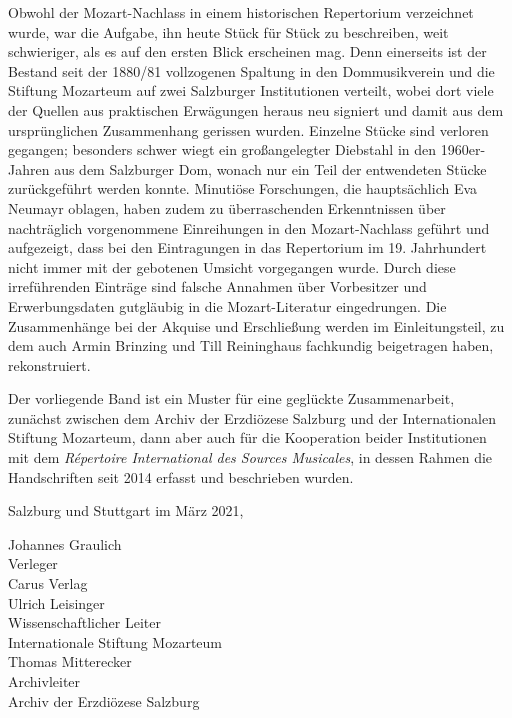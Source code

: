 Obwohl der \glqq Mozart-Nachlass\grqq{} in einem historischen Repertorium verzeichnet wurde, war die Aufgabe, ihn heute Stück für Stück zu beschreiben, weit schwieriger, als es auf den ersten Blick erscheinen mag. Denn einerseits ist der Bestand seit der 1880/81 vollzogenen Spaltung in den Dommusikverein und die \glqq Stiftung\grqq{} Mozarteum auf zwei Salzburger Institutionen verteilt, wobei dort viele der Quellen aus praktischen Erwägungen heraus neu signiert und damit aus dem ursprünglichen Zusammenhang gerissen wurden. Einzelne Stücke sind verloren gegangen; besonders schwer wiegt ein großangelegter Diebstahl in den 1960er-Jahren aus dem Salzburger Dom, wonach nur ein Teil der entwendeten Stücke zurückgeführt werden konnte. Minutiöse Forschungen, die hauptsächlich Eva Neumayr oblagen, haben zudem zu überraschenden Erkenntnissen über nachträglich vorgenommene Einreihungen in den \glqq Mozart-Nachlass\grqq{} geführt und aufgezeigt, dass bei den Eintragungen in das Repertorium im 19. Jahrhundert nicht immer mit der gebotenen Umsicht vorgegangen wurde. Durch diese irreführenden Einträge sind falsche Annahmen über Vorbesitzer und Erwerbungsdaten gutgläubig in die Mozart-Literatur eingedrungen. Die Zusammenhänge bei der Akquise und Erschließung werden im Einleitungsteil, zu dem auch Armin Brinzing und Till Reininghaus fachkundig beigetragen haben, rekonstruiert.

Der vorliegende Band ist ein Muster für eine geglückte Zusammenarbeit, zunächst zwischen dem Archiv der Erzdiözese Salzburg und der Internationalen Stiftung Mozarteum, dann aber auch für die Kooperation beider Institutionen mit dem \textit{Répertoire International des Sources Musicales}, in dessen Rahmen die Handschriften seit 2014 erfasst und beschrieben wurden.\bigskip

Salzburg und Stuttgart im März 2021,\bigskip\nopagebreak
\begin{multicols*}{3}
	\flushleft
	Johannes Graulich\\ Verleger\\ Carus Verlag\\\columnbreak
	Ulrich Leisinger\\ Wissenschaftlicher Leiter\\ Internationale Stiftung Mozarteum\\\columnbreak
	Thomas Mitterecker\\ Archivleiter\\ Archiv der Erzdiözese Salzburg
\end{multicols*}

